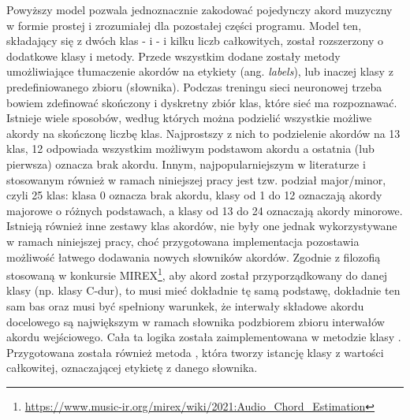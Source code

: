 Powyższy model pozwala jednoznacznie zakodować pojedynczy akord muzyczny w formie prostej i zrozumiałej dla pozostałej części programu. Model ten, składający się z dwóch klas -  i  - i kilku liczb całkowitych, został rozszerzony o dodatkowe klasy i metody. Przede wszystkim dodane zostały metody umożliwiające tłumaczenie akordów na etykiety (ang. \emph{labels}), lub inaczej klasy z predefiniowanego zbioru (słownika). Podczas treningu sieci neuronowej trzeba bowiem zdefinować skończony i dyskretny zbiór klas, które sieć ma rozpoznawać. Istnieje wiele sposobów, według których można podzielić wszystkie możliwe akordy na skończonę liczbę klas.  Najprostszy z nich to podzielenie akordów na 13 klas, 12 odpowiada wszystkim możliwym podstawom akordu a ostatnia (lub pierwsza) oznacza brak akordu. Innym, najpopularniejszym w literaturze i stosowanym również w ramach niniejszej pracy jest tzw. podział major/minor, czyli 25 klas: klasa 0 oznacza brak akordu, klasy od 1 do 12 oznaczają akordy majorowe o różnych podstawach, a klasy od 13 do 24 oznaczają akordy minorowe. Istnieją również inne zestawy klas akordów, nie były one jednak wykorzystywane w ramach niniejszej pracy, choć przygotowana implementacja pozostawia możliwość łatwego dodawania nowych słowników akordów. Zgodnie z filozofią stosowaną w konkursie MIREX\footnote{\url{https://www.music-ir.org/mirex/wiki/2021:Audio_Chord_Estimation}}, aby akord został przyporządkowany do danej klasy (np. klasy C-dur), to musi mieć dokładnie tę samą podstawę, dokładnie ten sam bas oraz musi być spełniony warunkek, że interwały składowe akordu docelowego są największym w ramach słownika podzbiorem zbioru interwałów akordu wejściowego. Cała ta logika została zaimplementowana w metodzie  klasy . Przygotowana została również metoda , która tworzy istancję klasy  z wartości całkowitej, oznaczającej etykietę z danego słownika.

